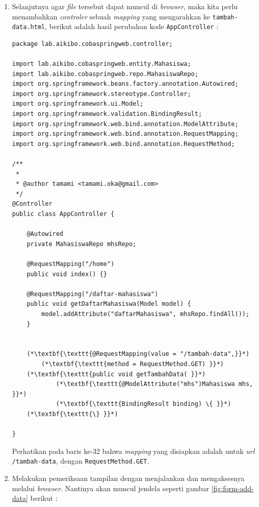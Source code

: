 \begin{enumerate}
	\item Selanjutnya agar \textit{file} tersebut dapat muncul di \textit{browser}, maka kita perlu menambahkan \textit{controler} sebuah \textit{mapping} yang mengarahkan ke \texttt{tambah-data.html}, berikut adalah hasil perubahan kode \texttt{AppController} :
	
	\begin{lstlisting}
package lab.aikibo.cobaspringweb.controller;

import lab.aikibo.cobaspringweb.entity.Mahasiswa;
import lab.aikibo.cobaspringweb.repo.MahasiswaRepo;
import org.springframework.beans.factory.annotation.Autowired;
import org.springframework.stereotype.Controller;
import org.springframework.ui.Model;
import org.springframework.validation.BindingResult;
import org.springframework.web.bind.annotation.ModelAttribute;
import org.springframework.web.bind.annotation.RequestMapping;
import org.springframework.web.bind.annotation.RequestMethod;

/**
 *
 * @author tamami <tamami.oka@gmail.com>
 */
@Controller
public class AppController {
    
    @Autowired
    private MahasiswaRepo mhsRepo;
    
    @RequestMapping("/home")
    public void index() {}
    
    @RequestMapping("/daftar-mahasiswa") 
    public void getDaftarMahasiswa(Model model) {
        model.addAttribute("daftarMahasiswa", mhsRepo.findAll());
    }
    

    (*\textbf{\texttt{@RequestMapping(value = "/tambah-data",}}*)
        (*\textbf{\texttt{method = RequestMethod.GET) }}*)
    (*\textbf{\texttt{public void getTambahData( }}*)
            (*\textbf{\texttt{@ModelAttribute("mhs")Mahasiswa mhs, }}*)
            (*\textbf{\texttt{BindingResult binding) \{ }}*)
    (*\textbf{\texttt{\} }}*)
    
}	
	\end{lstlisting}
	
	Perhatikan pada baris ke-32 bahwa \textit{mapping} yang disiapkan adalah untuk \textit{url} \texttt{/tambah-data}, dengan \texttt{RequestMethod.GET}.
	
	\item Melakukan pemeriksaan tampilan dengan menjalankan dan mengaksesnya melalui \textit{browser}. Nantinya akan muncul jendela seperti gambar \ref{fig:form-add-data} berikut :
	

\end{enumerate}
